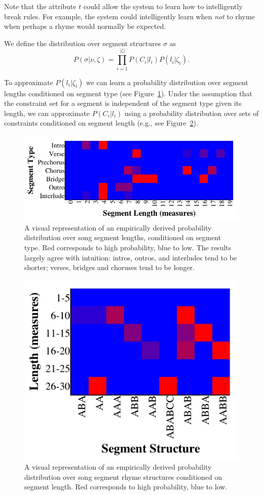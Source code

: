 \documentclass[letterpaper]{article}
\begin{document}
Note that the attribute $t$ could allow the system to learn how to intelligently break rules. For example, the system could intelligently learn when \emph{not} to rhyme when perhaps a rhyme would normally be expected.

We define the distribution over segment structures $\sigma$ as
\[ P(\sigma|\nu,\zeta) =  \prod_{i=1}^{|\zeta|} P(C_i | l_i) P(l_i|\zeta_i). \]

To approximate $P(l_i|\zeta_i)$ we can learn a probability distribution over segment lengths conditioned on segment type (see Figure~\ref{fig:measure_count_by_segment}). Under the assumption that the constraint set for a segment is independent of the segment type given its length, we can approximate $P(C_i | l_i)$ using a probability distribution over sets of constraints conditioned on segment length (e.g., see Figure~\ref{fig:segment_structure}).

\begin{figure}[t]
	\centering
	\includegraphics[width=\linewidth]{measure_count_by_segment}
	\caption{\label{fig:measure_count_by_segment} A visual representation of an empirically derived probability distribution over song segment lengths, conditioned on segment type. Red corresponds to high probability, blue to low. The results largely agree with intuition: intros, outros, and interludes tend to be shorter; verses, bridges and choruses tend to be longer.}
\end{figure}

\begin{figure}[t]
	\centering
	\includegraphics[width=.7\linewidth]{segment_structure}
	\caption{\label{fig:segment_structure} A visual representation of an empirically derived probability distribution over song segment rhyme structures conditioned on segment length. Red corresponds to high probability, blue to low.}
\end{figure}
\end{document}
